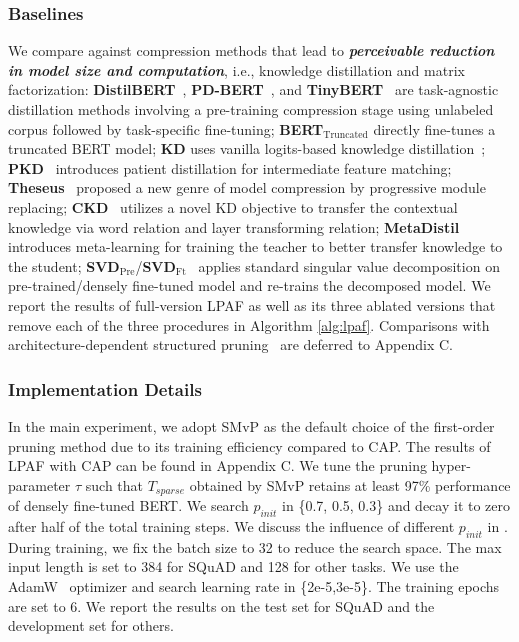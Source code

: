 \subsubsection{Baselines} We compare against compression methods that lead to \textbf{\textit{perceivable reduction in model size and computation}}, i.e., knowledge distillation and matrix factorization:
\textbf{DistilBERT}~\cite{distilbert}, \textbf{PD-BERT}~\cite{pdbert}, and \textbf{TinyBERT}~\cite{tinybert} are  task-agnostic distillation methods involving a pre-training compression stage using unlabeled corpus followed by task-specific fine-tuning; \textbf{BERT$_\text{Truncated}$} directly fine-tunes a truncated BERT model; \textbf{KD} uses vanilla logits-based knowledge distillation~\cite{kd}; \textbf{PKD}~\cite{pkd} introduces patient distillation for intermediate feature matching; 
\textbf{Theseus}~\cite{theseus} proposed a new genre of model compression by progressive module replacing; \textbf{CKD}~\cite{CKD} utilizes a novel KD objective to transfer the contextual knowledge via word relation and layer transforming relation; \textbf{MetaDistil}~\cite{metadistil} introduces meta-learning for training the teacher to better transfer knowledge to the student; \textbf{SVD}$_{\text{Pre}}$/\textbf{SVD}$_{\text{Ft}}$~\cite{svd} applies standard singular value decomposition on pre-trained/densely fine-tuned model and re-trains the decomposed model. We report the results of full-version LPAF as well as its three ablated versions that remove each of the three procedures in Algorithm \ref{alg:lpaf}. Comparisons with architecture-dependent structured pruning~\cite{l0} are deferred to Appendix C. 

\subsubsection{Implementation Details}
In the main experiment, we adopt SMvP as the default choice of the first-order pruning method due to its training efficiency compared to CAP. The results of LPAF with CAP can be found in Appendix C. We tune the pruning hyper-parameter $\tau$ such that $T_{sparse}$ obtained by SMvP retains at least 97\% performance of densely fine-tuned BERT. We search $p_{init}$ in \{0.7, 0.5, 0.3\} and decay it to zero after half of the total training steps. We discuss the influence of different $p_{init}$ in . During training, we
fix the batch size to 32 to reduce the search space. The max input length is set to 384 for SQuAD and 128 for other tasks. We use the AdamW~\cite{adamw} optimizer and search learning rate in \{2e-5,3e-5\}. The training epochs are set to 6. We report the results on the test set for SQuAD and the development set for others.

